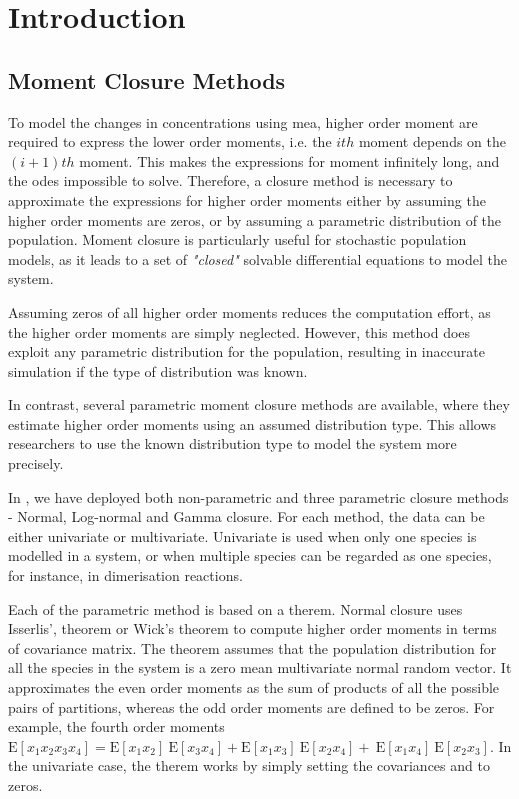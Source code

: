 \section{Introduction} \label{intro}
\subsection{Moment Closure Methods}
To model the changes in concentrations using \gls{mea}, higher order moment are required to express the lower order moments, i.e. the $ith$ moment depends on the $(i+1)th$ moment. This makes the expressions for moment infinitely long, and the \glspl{ode} impossible to solve. Therefore, a closure method is necessary to approximate the expressions for higher order moments either by assuming the higher order moments are zeros, or by assuming a parametric distribution of the population. Moment closure is particularly useful for stochastic population models, as it leads to a set of \emph{"closed"} solvable differential equations to model the system. 

Assuming zeros of all higher order moments reduces the computation effort, as the higher order moments are simply neglected. However, this method does exploit any parametric distribution for the population, resulting in inaccurate simulation if the type of distribution was known. 

In contrast, several parametric moment closure methods are available, where they estimate higher order moments using an assumed distribution type. This allows researchers to use the known distribution type to model the system more precisely. 

In \means, we have deployed both non-parametric and three parametric closure methods - Normal, Log-normal and Gamma closure. For each method, the data can be either univariate or multivariate. Univariate is used when only one species is modelled in a system, or when multiple species can be regarded as one species, for instance, in dimerisation reactions. 

Each of the parametric method is based on a therem. Normal closure uses Isserlis\rq , theorem or Wick\rq s theorem to compute higher order moments in terms of covariance matrix. The theorem assumes that the population distribution for all the species in the system is a zero mean multivariate normal random vector. It approximates the even order moments as the sum of products of all the possible pairs of partitions, whereas the odd order moments are defined to be zeros. For example, the fourth order moments $\mathrm{E}[x_1x_2x_3x_4] = \mathrm{E}[x_1x_2]\ \mathrm{E}[x_3x_4] + \mathrm{E}[x_1x_3]\ \mathrm{E}[x_2x_4]+\ \mathrm{E}[x_1x_4]\ \mathrm{E}[x_2x_3]$. In the univariate case, the therem works by simply setting the covariances and to zeros. 

